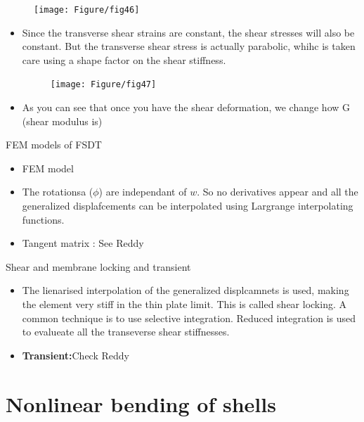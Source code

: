 	\begin{frame}
		\begin{figure}
			\centering
			\texttt{[image: Figure/fig46]}  		
		\end{figure}
	\end{frame}


	\begin{frame}
		\begin{itemize}
			\item Since the transverse shear strains are constant, the shear stresses will also be constant. But the transverse shear stress is actually parabolic, whihc is taken care using a shape factor on the shear stiffness. 
			\begin{figure}
				\centering
				\texttt{[image: Figure/fig47]}  		
			\end{figure}
			\item As you can see that once you have the shear deformation, we change how G (shear modulus is)
		\end{itemize}
	\end{frame}


	\begin{frame}{FEM models of FSDT}
		\begin{itemize}
			\item FEM model
			\item  The rotationsa ($\phi$) are independant of $w$. So no derivatives appear and all the  generalized displafcements can be interpolated using Largrange interpolating functions.
			\item Tangent matrix : See Reddy
			
		\end{itemize}
	\end{frame}


	\begin{frame}{Shear and membrane locking and transient}
		\begin{itemize}
			\item The lienarised interpolation of the generalized displcamnets is used, making the element very stiff in the thin plate limit. This is called shear locking. A common technique is to use selective integration. Reduced integration is used to evalueate all the transeverse shear stiffnesses.			
			\item \textbf{Transient:}Check Reddy
	\end{itemize}
	\end{frame}


\section{Nonlinear bending of shells}

